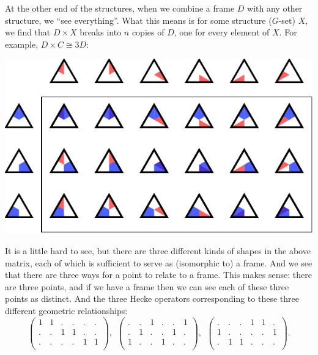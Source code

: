 \documentclass[11pt,oneside]{article}
\begin{document}
At the other end of the structures, 
when we combine a frame $D$ with any other structure,
we ``see everything''.
What this means is 
for some structure ($G$-set) $X$, we find that $D\times X$
breaks into $n$ copies of $D$, one for every element of $X$.
For example, $D\times C\cong 3D:$
\begin{center}
\includegraphics[]{pic-triangle-point-frame-matrix.pdf} 
\end{center}
It is a little hard to see, but there are three different
kinds of shapes in the above matrix, 
each of which is sufficient to serve as (isomorphic to) a frame.
And we see that there are three ways for a point to relate to
a frame. This makes sense: there are three points, and if we
have a frame then we can see each of these three points as distinct.
And the three Hecke operators corresponding to these three
different geometric relationships:
$$
\left( \begin{array}{cccccc}
1 & 1 & . & . & . & . \\
. & . & 1 & 1 & . & . \\
. & . & . & . & 1 & 1 \\
\end{array} \right),\ \ 
\left( \begin{array}{cccccc}
. & . & 1 & . & . & 1 \\
. & 1 & . & . & 1 & . \\
1 & . & . & 1 & . & . \\
\end{array} \right),\ \ 
\left( \begin{array}{cccccc}
. & . & . & 1 & 1 & . \\
1 & . & . & . & . & 1 \\
. & 1 & 1 & . & . & . \\
\end{array} \right).
$$
\end{document}
